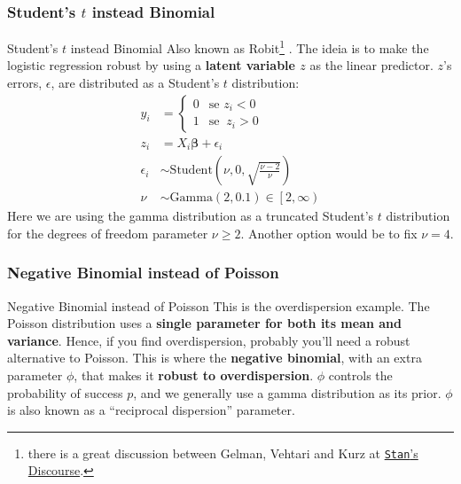 \subsubsection{Student's $t$ instead Binomial}
\begin{frame}{Student's $t$ instead Binomial}
	\small
	Also known as Robit\footnote{there is a great discussion between
		Gelman, Vehtari and Kurz at
		\href{https://discourse.mc-stan.org/t/robit-regression-not-robust/21245/}{
			\texttt{Stan}'s Discourse}.} \parencite{gelman2013bayesian, gelman2020regression}.
	The ideia is to make the logistic regression robust by using a
	\textbf{latent variable $z$} as the linear predictor.
	$z$'s errors, $\epsilon$, are distributed as a Student's $t$ distribution:
	$$
		\begin{aligned}
			y_i        & = \begin{cases} 0 & \text{se } z_i < 0 \\ 1 & \text{se }\ z_i > 0 \end{cases} \\
			z_i        & = X_i \boldsymbol{\beta} + \epsilon_i                                         \\
			\epsilon_i & \sim \text{Student} \left (\nu, 0, \sqrt{\frac{\nu - 2}{\nu}} \right)         \\
			\nu        & \sim \text{Gamma}(2, 0.1) \in \left[2, \infty \right)
		\end{aligned}
	$$
	\footnotesize
	Here we are using the gamma distribution as a truncated Student's $t$
	distribution for the degrees of freedom parameter $\nu \geq 2$.
	Another option would be to fix $\nu = 4$.
\end{frame}

\subsubsection{Negative Binomial instead of Poisson}
\begin{frame}{Negative Binomial instead of Poisson}
	This is the overdispersion example.
	The Poisson distribution uses a \textbf{single parameter for both its mean and variance}.
	\vfill
	Hence, if you find overdispersion, probably you'll need a robust alternative to Poisson.
	This is where the \textbf{negative binomial}, with an extra parameter $\phi$,
	that makes it \textbf{robust to overdispersion}.
	\vfill
	$\phi$ controls the probability of success $p$,
	and we generally use a gamma distribution as its prior.
	$\phi$ is also known as a ``reciprocal dispersion'' parameter.
\end{frame}

